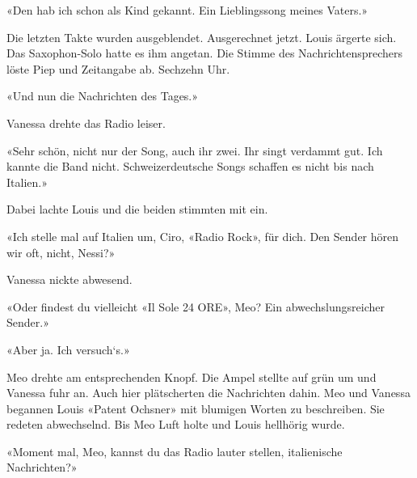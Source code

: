 «Den hab ich schon als Kind gekannt. Ein Lieblingssong meines Vaters.»


Die letzten Takte wurden ausgeblendet. Ausgerechnet jetzt. Louis ärgerte
sich. Das Saxophon-Solo hatte es ihm angetan.
Die Stimme des Nachrichtensprechers löste Piep und Zeitangabe ab. Sechzehn Uhr.

«Und nun die Nachrichten des Tages.»

Vanessa drehte das Radio leiser.

«Sehr schön, nicht nur der Song, auch ihr zwei. Ihr singt verdammt gut.
Ich kannte die Band nicht. Schweizerdeutsche Songs schaffen es nicht bis
nach Italien.»

Dabei lachte Louis und die beiden stimmten mit ein.

«Ich stelle mal auf Italien um, Ciro, «Radio Rock», für dich. Den Sender
hören wir oft, nicht, Nessi?»

Vanessa nickte abwesend. 

«Oder findest du vielleicht «Il Sole 24 ORE», Meo? Ein abwechslungsreicher Sender.»

«Aber ja. Ich versuch`s.» 

Meo drehte am entsprechenden Knopf. 
Die Ampel stellte auf grün um und Vanessa fuhr an.
Auch hier plätscherten die Nachrichten dahin. Meo und Vanessa begannen
Louis «Patent Ochsner» mit blumigen Worten zu beschreiben. Sie redeten
abwechselnd. Bis Meo Luft holte und Louis hellhörig wurde.

«Moment mal, Meo, kannst du das Radio lauter stellen, italienische
Nachrichten?»

\sectionbreak


